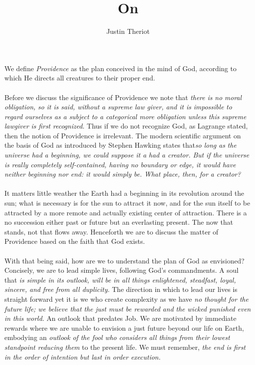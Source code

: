 \documentclass[11pt, sigconf, nonacm]{acmart}
\begin{document}
\title{On }

\author{Justin Theriot}

\maketitle

We define \textit{Providence} as the plan conceived in the mind of God, according to which He directs all creatures to their proper end. 
\ \\
\ \\
Before we discuss the significance of Providence we note that \textit{there is no moral obligation, so it is said, without a supreme law giver, and it is impossible to regard ourselves as a subject to a categorical more obligation unless this supreme lawgiver is first recognized.} Thus if we do not recognize God, as Lagrange stated, then the notion of Providence is irrelevant. The modern scientific argument on the basis of God as introduced by Stephen Hawking states that\textit{so long as the universe had a beginning, we could suppose it a had a creator. But if the universe is really completely self-contained, having no boundary or edge, it would have neither beginning nor end: it would simply be. What place, then, for a creator?} 
\ \\
\ \\
It matters little weather the Earth had a beginning in its revolution around the sun; what is necessary is for the sun to attract it now, and for the sun itself to be attracted by a more remote and actually existing center of attraction. There is a no succession either past or future but an everlasting present. The now that stands, not that flows away. Henceforth we are to discuss the matter of Providence based on the faith that God exists. 
\ \\
\ \\
With that being said, how are we to understand the plan of God as envisioned? Concisely, we are to lead simple lives, following God's commandments. A soul that \textit{is simple in its outlook, will be in all things enlightened, steadfast, loyal, sincere, and free from all duplicity.} The direction in which to lead our lives is straight forward yet it is we who create complexity as we have \textit{no thought for the future life; we believe that the just must be rewarded and the wicked punished even in this world.} An outlook that predates Job. We are motivated by immediate rewards where we are unable to envision a just future beyond our life on Earth, embodying an \textit{outlook of the fool who considers all things from their lowest standpoint reducing them} to the present life. We must remember, \textit{the end is first in the order of intention but last in order execution.} 
\end{document}
